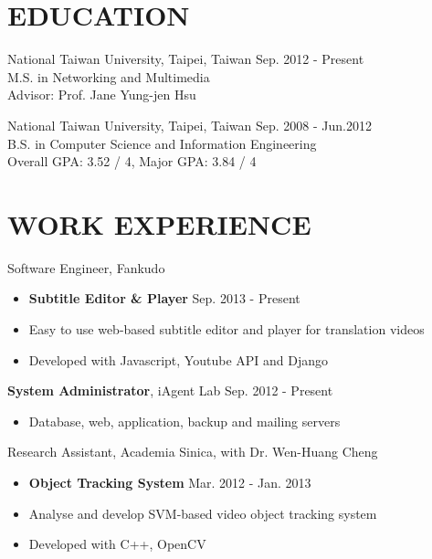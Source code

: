 \documentclass[margin]{main}
\begin{document}
 
 

\address{
    4F., No.10, Aly. 4, Ln. 201, Yucheng St., \\
    Nangang Dist., Taipei City 115, \\
    Taiwan (R.O.C)
}

\address{
    \hfill +886-923-869-910 \\
    \hfill john.lin.chichin@gmail.com \\
    \hfill \url{http://github.com/averangeall}
}

\begin{resume}
 
\section{EDUCATION}
National Taiwan University, Taipei, Taiwan \hfill Sep. 2012 - Present \\
M.S. in Networking and Multimedia \\
Advisor: Prof. Jane Yung-jen Hsu
 
National Taiwan University, Taipei, Taiwan \hfill Sep. 2008 - Jun.2012 \\
B.S. in Computer Science and Information Engineering \\
Overall GPA: 3.52 / 4, Major GPA: 3.84 / 4


\section{WORK EXPERIENCE}
Software Engineer, Fankudo
\begin{itemize} \itemsep -2pt
    \item[] {\bf Subtitle Editor \& Player} \hfill Sep. 2013 - Present
    \item[] Easy to use web-based subtitle editor and player for translation videos
    \item[] Developed with Javascript, Youtube API and Django
\end{itemize}

{\bf System Administrator}, iAgent Lab \hfill Sep. 2012 - Present
\begin{itemize} \itemsep -2pt
    \item[] Database, web, application, backup and mailing servers
\end{itemize}

Research Assistant, Academia Sinica, with Dr. Wen-Huang Cheng
\begin{itemize} \itemsep -2pt
    \item[] {\bf Object Tracking System} \hfill Mar. 2012 - Jan. 2013
    \item[] Analyse and develop SVM-based video object tracking system
    \item[] Developed with C++, OpenCV
\end{itemize}



\end{resume}
\end{document}
